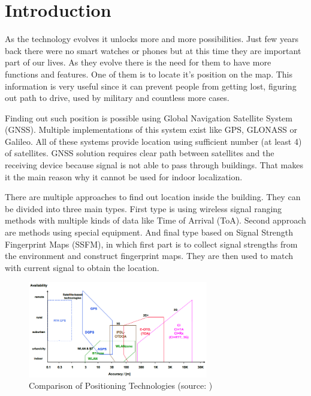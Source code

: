 \chapter{Introduction}\label{sec:Introduction}
\setcounter{page}{1}
As the technology evolves it unlocks more and more possibilities. Just few years back there were no smart watches or phones but at this time they are important part of our lives. As they evolve there is the need for them to have more functions and features. One of them is to locate it's position on the map. This information is very useful since it can prevent people from getting lost, figuring out path to drive, used by military and countless more cases.

Finding out such position is possible using Global Navigation Satellite System (GNSS). Multiple implementations of this system exist like GPS, GLONASS or Galileo. All of these systems provide location using sufficient number (at least 4) of satellites.\cite{GNSS} GNSS solution requires clear path between satellites and the receiving device because signal is not able to pass through buildings. That makes it the main reason why it cannot be used for indoor localization.

There are multiple approaches to find out location inside the building. They can be divided into three main types. First type is using wireless signal ranging methods with multiple kinds of data like Time of Arrival (ToA). Second approach are methods using special equipment. And final type based on Signal Strength Fingerprint Maps (SSFM), in which first part is to collect signal strengths from the environment and construct fingerprint maps. They are then used to match with current signal to obtain the location.\cite{LocalizationApproaches}

\begin{figure}[h!]
	\begin{centering}
		\includegraphics[width=0.7\textwidth]{img/1_comparison_of_positionin_technologies}
		\par\end{centering}
	\caption{Comparison of Positioning Technologies (source: \cite{PedestrianDeadReckoning})\label{fig:1_comparison_of_positionin_technologies}}
\end{figure}

